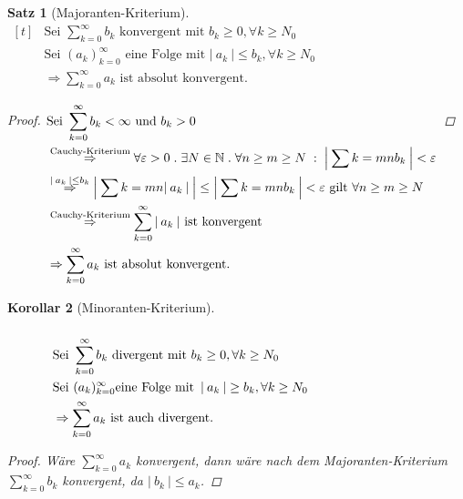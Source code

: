 \documentclass[a4paper,titlepage,oneside]{article}
\def\N{\ensuremath{\mathbb{N}} }
\renewcommand{\epsilon}{\ensuremath{\varepsilon} }
\def\WSP{\text{Widerspruch! }}
\def\sp{\hspace{0,1cm}}
\def\spdot{\sp.\sp}
\def\spcolon{\sp:\sp}
\newcommand{\suminf}[2][n]{\ensuremath{\sum_{#1= 0}^{\infty}{#2}}}
\newcommand{\abs}[1]{\ensuremath{\left|\:#1\:\right|}}
\theoremstyle{thmstyle}
\newtheorem{satz}{Satz}[section]
\newtheorem{korr}[satz]{Korollar}
\theoremstyle{subthmstyle}
\begin{document}
\begin{satz}[Majoranten-Kriterium]
\begin{math}\displaystyle \begin{aligned}[t]
&\text{Sei } \suminf[k]{b_k} \text{ konvergent mit } b_k \ge 0 , \forall k \ge N_0 \\
&\text{Sei } (a_k)_{k=0}^{\infty} \text{ eine Folge mit } \abs{a_k} \le b_k , \forall k \ge N_0 \\
&\Rightarrow \suminf[k]{a_k} \text{ ist absolut konvergent.}
\end{aligned}\end{math}

\begin{proof}
\begin{math}\displaystyle \begin{aligned}[t]
&\text{Sei } \suminf[k]{b_k} < \infty \text{ und } b_k > 0 \\
&\overset{\text{Cauchy-Kriterium}}{\Rightarrow} \forall \epsilon > 0 \spdot \exists N \in \N \spdot \forall n \ge m \ge N \spcolon \abs{\sum{k=m}{n}{b_k}} < \epsilon \\
&\overset{\abs{a_k} \le b_k}{\Rightarrow} \abs{\sum{k=m}{n}{\abs{a_k}}} \le \abs{\sum{k=m}{n}{b_k}} < \epsilon \text{ gilt } \forall n \ge m \ge N \\
&\overset{\text{Cauchy-Kriterium}}{\Rightarrow} \suminf[k]{\abs{a_k}} \text{ ist konvergent} \\
&\Rightarrow \suminf[k]{a_k}\text{ ist absolut konvergent.}
\end{aligned}\\\end{math} 
\end{proof}
\end{satz}

\begin{korr}[Minoranten-Kriterium]
\begin{math}\displaystyle \begin{aligned}[t]
\hphantom{mmmm}\\
&\text{Sei } \suminf[k]{b_k} \text{ divergent mit } b_k \ge 0 , \forall k \ge N_0 \\
&\text{Sei } (a_k)_{k=0}^{\infty} \text{eine Folge mit } \abs{a_k} \ge b_k , \forall k \ge N_0 \\
&\Rightarrow \suminf[k]{a_k} \text{ ist auch divergent.}
\end{aligned}\end{math}

\begin{proof}
Wäre $\displaystyle\suminf[k]{a_k}$ konvergent, dann wäre nach dem Majoranten-Kriterium $\displaystyle \suminf[k]{b_k}$ konvergent, da $\displaystyle \abs{b_k} \le a_k$. \WSP
\end{proof}
\end{korr}
\end{document}
